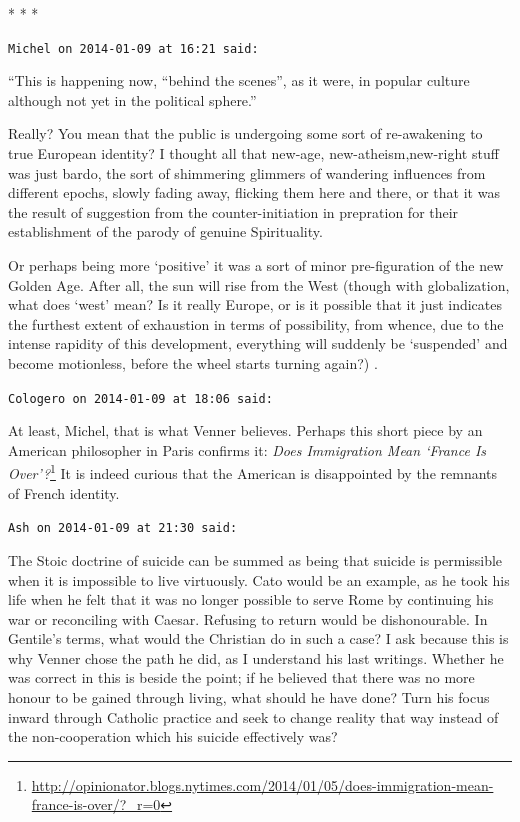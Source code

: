 
\begin{center}* * *\end{center}

\begin{footnotesize}
\begin{sffamily}

\texttt{Michel on 2014-01-09 at 16:21 said:}

``This is happening now, ``behind the scenes'', as it were, in popular culture although not yet in the political sphere.''

Really? You mean that the public is undergoing some sort of re-awakening to true European identity? I thought all that new-age, new-atheism,new-right stuff was just bardo, the sort of shimmering glimmers of wandering influences from different epochs, slowly fading away, flicking them here and there, or that it was the result of suggestion from the counter-initiation in prepration for their establishment of the parody of genuine Spirituality.

Or perhaps being more `positive' it was a sort of minor pre-figuration of the new Golden Age. After all, the sun will rise from the West (though with globalization, what does `west' mean? Is it really Europe, or is it possible that it just indicates the furthest extent of exhaustion in terms of possibility, from whence, due to the intense rapidity of this development, everything will suddenly be `suspended' and become motionless, before the wheel starts turning again?) .

\hfill

\texttt{Cologero on 2014-01-09 at 18:06 said:}

At least, Michel, that is what Venner believes. Perhaps this short piece by an American philosopher in Paris confirms it: \textit{Does Immigration Mean `France Is Over'?}\footnote{\url{http://opinionator.blogs.nytimes.com/2014/01/05/does-immigration-mean-france-is-over/?\_r=0}} It is indeed curious that the American is disappointed by the remnants of French identity.

\hfill

\texttt{Ash on 2014-01-09 at 21:30 said:}

The Stoic doctrine of suicide can be summed as being that suicide is permissible when it is impossible to live virtuously. Cato would be an example, as he took his life when he felt that it was no longer possible to serve Rome by continuing his war or reconciling with Caesar. Refusing to return would be dishonourable. In Gentile's terms, what would the Christian do in such a case? I ask because this is why Venner chose the path he did, as I understand his last writings. Whether he was correct in this is beside the point; if he believed that there was no more honour to be gained through living, what should he have done? Turn his focus inward through Catholic practice and seek to change reality that way instead of the non-cooperation which his suicide effectively was?


\end{sffamily}
\end{footnotesize}

